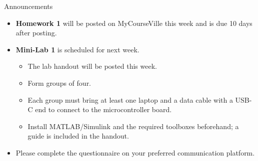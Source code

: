 \documentclass[12pt, aspectratio=169]{beamer}
\begin{document}
\begin{frame}{Announcements}
    \begin{itemize}
        \item \textbf{Homework 1} will be posted on MyCourseVille this week and is due
        10 days after posting.
        \item \textbf{Mini-Lab 1} is scheduled for next week.
        \begin{itemize}
            \item The lab handout will be posted this week.
            \item Form groups of four.
            \item Each group must bring at least one laptop and a data cable with a USB-C end to connect to the microcontroller board.
            \item Install MATLAB/Simulink and the required toolboxes beforehand; a guide is included in the handout.
        \end{itemize}
        \item Please complete the questionnaire on your preferred communication platform.
    \end{itemize}
\end{frame}
\end{document}
